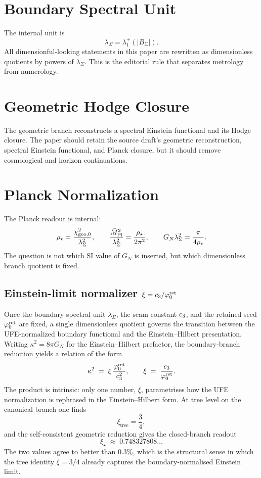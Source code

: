 \documentclass[11pt,a4paper]{article}
\begin{document}
\tableofcontents

\section{Boundary Spectral Unit}

The internal unit is
\[
\lambda_\Sigma=\lambda_1^+(|B_\Sigma|).
\]
All dimensionful-looking statements in this paper are rewritten as dimensionless quotients by
powers of $\lambda_\Sigma$. This is the editorial rule that separates metrology from numerology.

\section{Geometric Hodge Closure}

The geometric branch reconstructs a spectral Einstein functional and its Hodge closure. The paper
should retain the source draft's geometric reconstruction, spectral Einstein functional, and Planck
closure, but it should remove cosmological and horizon continuations.

\section{Planck Normalization}

The Planck readout is internal:
\[
\rho_\star=\frac{\chi_{\mathrm{geo},0}^2}{\lambda_\Sigma^2},
\qquad
\frac{\bar M_{\mathrm{Pl}}^2}{\lambda_\Sigma^2}=\frac{\rho_\star}{2\pi^2},
\qquad
G_N\lambda_\Sigma^2=\frac{\pi}{4\rho_\star}.
\]
The question is not which SI value of $G_N$ is inserted, but which dimensionless branch quotient is
fixed.

\subsection{Einstein-limit normalizer \texorpdfstring{$\xi=c_3/\varphi_0^{\mathrm{ret}}$}{xi = c3/phi0}}
\label{ssec:einstein-limit-normalizer}

Once the boundary spectral unit $\lambda_\Sigma$, the seam constant $c_3$, and the retained
seed $\varphi_0^{\mathrm{ret}}$ are fixed, a single dimensionless quotient governs the transition between the
UFE-normalized boundary functional and the Einstein--Hilbert presentation. Writing
$\kappa^2=8\pi G_N$ for the Einstein--Hilbert prefactor, the boundary-branch reduction yields a
relation of the form
\begin{equation}
\label{eq:kappa-xi}
\kappa^2 \;=\; \xi\,\frac{\varphi_0^{\mathrm{ret}}}{c_3^2},
\qquad
\xi \;=\; \frac{c_3}{\varphi_0^{\mathrm{ret}}}.
\end{equation}
The product is intrinsic: only one number, $\xi$, parametrises how the UFE normalization is
rephrased in the Einstein--Hilbert form. At tree level on the canonical branch one finds
\[
\xi_{\mathrm{tree}}=\frac{3}{4},
\]
and the self-consistent geometric reduction gives the closed-branch readout
\[
\xi_\star \;\approx\; 0.748327808\ldots
\]
The two values agree to better than $0.3\%$, which is the structural sense in which the tree
identity $\xi=3/4$ already captures the boundary-normalised Einstein limit.
\end{document}

